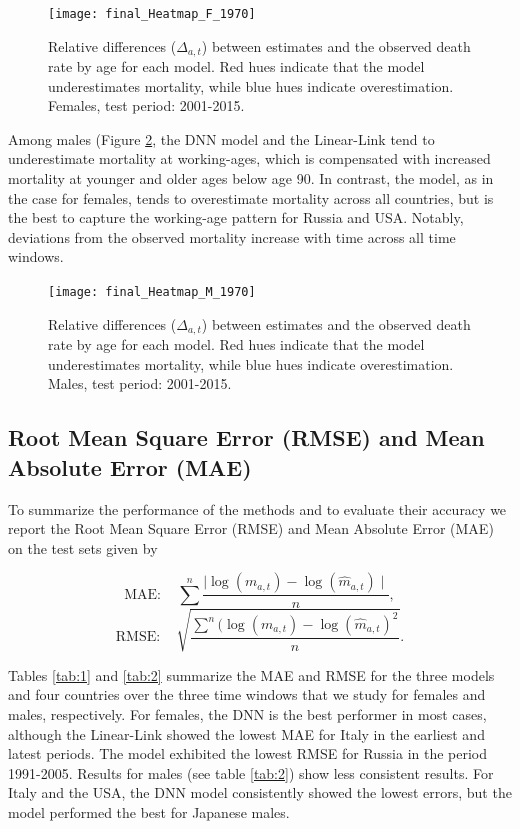 \documentclass[a4,11pt]{article}
\begin{document}
\begin{figure}[H]
	\centering
	\texttt{[image: final\_Heatmap\_F\_1970]}\\
	 \caption{Relative differences ($\Delta_{a,t}$) between estimates and the observed death rate by age for each model. Red hues indicate that the model underestimates mortality, while blue hues indicate overestimation. Females, test period: 2001-2015.}
	 \label{fig:relative.diff}
\end{figure}

Among males (Figure \ref{fig:relative.diff.MALE}, the DNN model and the Linear-Link tend to underestimate mortality at working-ages, which is compensated with increased mortality at younger and older ages below age 90. In contrast, the \citet{Sevcikova} model, as in the case for females, tends to overestimate mortality across all countries, but is the best to capture the working-age pattern for Russia and USA. Notably, deviations from the observed mortality increase with time across all time windows.

\begin{figure}[H]
	\centering
	\texttt{[image: final\_Heatmap\_M\_1970]}\\
	 \caption{Relative differences ($\Delta_{a,t}$) between estimates and the observed death rate by age for each model. Red hues indicate that the model underestimates mortality, while blue hues indicate overestimation. Males, test period: 2001-2015.}
	 \label{fig:relative.diff.MALE}
\end{figure}

\subsection*{Root Mean Square Error (RMSE) and Mean Absolute Error (MAE)}

To summarize the performance of the methods and to evaluate their accuracy we report the Root Mean Square Error (RMSE) and Mean Absolute Error (MAE) on the test sets given by 

\begin{equation*}
	\text{MAE}: \quad \sum^{n} \frac{\mid \log(m_{a,t}) - \log(\hat{m}_{a,t}) \mid}{n},
	\end{equation*}
	\begin{equation*}
	\text{RMSE}: \quad \sqrt{\frac{\sum^{n} (\log(m_{a,t}) - \log(\hat{m}_{a,t})^2}{n}}. 
\end{equation*}

Tables \ref{tab:1} and \ref{tab:2} summarize the MAE and RMSE for the three models and four countries over the three time windows that we study for females and males, respectively. For females, the DNN is the best performer in most cases, although the Linear-Link showed the lowest MAE for Italy in the earliest and latest periods. The \citet{Sevcikova} model exhibited the lowest RMSE for Russia in the period 1991-2005. Results for males (see table \ref{tab:2}) show less consistent results. For Italy and the USA, the DNN model consistently showed the lowest errors, but the \citet{Sevcikova} model performed the best for Japanese males. 
\end{document}
